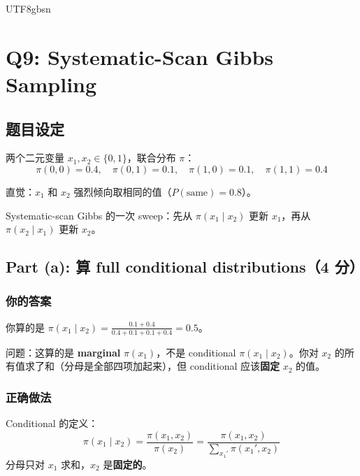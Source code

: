 \documentclass[11pt]{article}
\begin{document}
\begin{CJK}{UTF8}{gbsn}
\vspace{0.3em}
\noindent{}

\newpage

\section{Q9: Systematic-Scan Gibbs Sampling}

\subsection{题目设定}

两个二元变量 $x_1, x_2 \in \{0, 1\}$，联合分布 $\pi$：
\[
  \pi(0,0) = 0.4, \quad \pi(0,1) = 0.1, \quad \pi(1,0) = 0.1, \quad \pi(1,1) = 0.4
\]

直觉：$x_1$ 和 $x_2$ 强烈倾向取相同的值（$P(\text{same}) = 0.8$）。

Systematic-scan Gibbs 的一次 sweep：先从 $\pi(x_1 \mid x_2)$ 更新 $x_1$，再从 $\pi(x_2 \mid x_1)$ 更新 $x_2$。

\subsection{Part (a): 算 full conditional distributions（4 分）}

\subsubsection{你的答案}

你算的是 $\pi(x_1 \mid x_2) = \frac{0.1 + 0.4}{0.4 + 0.1 + 0.1 + 0.4} = 0.5$。

问题：这算的是 \textbf{marginal} $\pi(x_1)$，不是 conditional $\pi(x_1 \mid x_2)$。你对 $x_2$ 的所有值求了和（分母是全部四项加起来），但 conditional 应该\textbf{固定} $x_2$ 的值。

\subsubsection{正确做法}

Conditional 的定义：
\[
  \pi(x_1 \mid x_2) = \frac{\pi(x_1, x_2)}{\pi(x_2)}
  = \frac{\pi(x_1, x_2)}{\sum_{x_1'} \pi(x_1', x_2)}
\]
分母只对 $x_1$ 求和，$x_2$ 是\textbf{固定的}。


\end{CJK}
\end{document}
